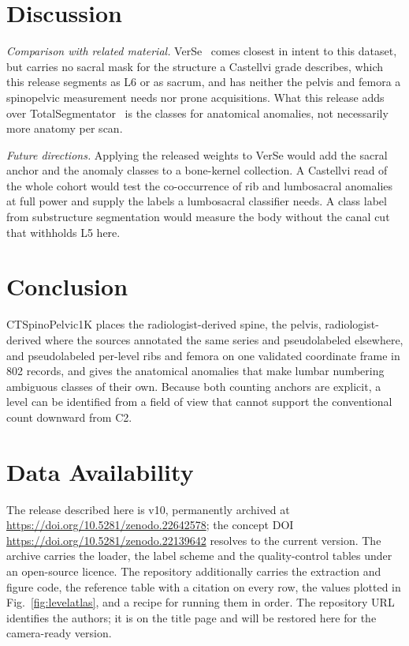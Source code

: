 \documentclass[aapm,mph,amsmath,amssymb,reprint]{revtex4-2}
\newcommand{\datasetdoi}{10.5281/zenodo.22139642}
\newcommand{\datasetversiondoi}{10.5281/zenodo.22642578}
\newcommand{\datasetversion}{v10}
\newif\ifreview \reviewtrue
\newcommand{\doiurl}[1]{\url{https://doi.org/#1}}
\begin{document}
\section{Discussion}

\emph{Comparison with related material.}
VerSe~\cite{verse2021,versedata2021} comes closest in intent to this dataset, but carries no
sacral mask for the structure a Castellvi grade describes, which this release segments as L6
or as sacrum, and has neither the pelvis and femora a spinopelvic measurement needs nor prone
acquisitions. What this release adds
over TotalSegmentator~\cite{totalsegmentator} is the classes for anatomical anomalies, not necessarily more
anatomy per scan.

\emph{Future directions.} Applying the released weights to VerSe would add the sacral anchor
and the anomaly classes to a bone-kernel collection. A Castellvi read of the whole cohort
would test the co-occurrence of rib and lumbosacral anomalies at full power and supply the
labels a lumbosacral classifier needs. A class label from substructure
segmentation\cite{spineps2025} would measure the body without the canal cut that withholds
L5 here.

\section{Conclusion}

CTSpinoPelvic1K places the radiologist-derived spine, the pelvis, radiologist-derived where
the sources annotated the same series and pseudolabeled elsewhere, and pseudolabeled per-level
ribs and femora on one validated coordinate frame in 802 records, and gives the anatomical
anomalies that make lumbar numbering ambiguous classes of their own.
Because both counting anchors are explicit, a level can be identified from a field of view
that cannot support the conventional count downward from C2.

\section*{Data Availability}
The release described here is \datasetversion{}, permanently archived at
\doiurl{\datasetversiondoi}; the concept DOI \doiurl{\datasetdoi} resolves to the
current version.
The archive carries the loader, the label scheme and the quality-control tables under an
open-source licence. The repository additionally carries the extraction and figure code,
the reference table with a citation on every row, the values plotted in
Fig.~\ref{fig:levelatlas}, and a recipe for running them in order. \ifreview The
repository URL identifies the authors; it is on the title page and will be restored here for
the camera-ready version.\else Code:
\url{https://github.com/OpenSpineConsortium/CTSpinoPelvic1K} (article materials under
\texttt{paper/mpda/}); convenience mirror:
\url{https://huggingface.co/datasets/OpenSpineConsortium/CTSpinoPelvic1K}; measurement
toolkit: \url{https://github.com/OpenSpineConsortium/OpenSpineToolkit}.\fi
\end{document}
